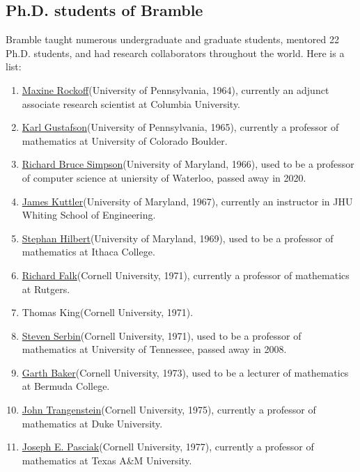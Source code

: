 \documentclass[CJK,11pt]{amsart}
\theoremstyle{definition}
\begin{document}
\begin{CJK*}{UTF8}{gbsn}
\subsection{Ph.D. students of Bramble}
Bramble taught numerous undergraduate and graduate students, mentored
22 Ph.D. students, and had  research collaborators
throughout the world. Here is a list:
% 
\begin{enumerate}
\item \href{https://www.linkedin.com/in/maxine-rockoff-394b114/}{Maxine Rockoff}(University of Pennsylvania, 1964), currently an adjunct associate research scientist at Columbia University.
\item \href{http://euclid.colorado.edu/~gustafs/}{Karl Gustafson}(University of Pennsylvania, 1965), currently a professor of mathematics at University of Colorado Boulder.
\item \href{https://cs.uwaterloo.ca/~rbsimpso/RBScv.pdf}{Richard Bruce Simpson}(University of Maryland, 1966), used to be a professor of computer science at uniersity of Waterloo, passed away in 2020.
\item \href{https://ep.jhu.edu/faculty/james-kuttler/}{James Kuttler}(University of Maryland, 1967), currently an instructor in JHU Whiting School of Engineering.
\item \href{https://en.wikipedia.org/wiki/Stephen_Hilbert}{Stephan Hilbert}(University of Maryland, 1969), used to be a professor of mathematics at Ithaca College.
\item \href{https://sites.math.rutgers.edu/~falk/}{Richard Falk}(Cornell University, 1971), currently a professor of mathematics at Rutgers.
\item Thomas King(Cornell University, 1971).
\item \href{https://www.legacy.com/us/obituaries/knoxnews/name/steven-serbin-obituary?pid=120620923}{Steven Serbin}(Cornell University, 1971), used to be a professor of mathematics at University of Tennessee, passed away in 2008.
\item \href{http://www.math.buffalo.edu/mad/PEEPS/baker_gartha.html}{Garth Baker}(Cornell University, 1973), used to be a lecturer of mathematics at Bermuda College.
\item \href{https://services.math.duke.edu/~johnt/}{John Trangenstein}(Cornell University, 1975), currently a professor of mathematics at Duke University.
\item \href{https://www.math.tamu.edu/~joe.pasciak/}{Joseph E. Pasciak}(Cornell University, 1977), currently a professor of mathematics at Texas A\&M University.

\end{enumerate}
\end{CJK*}
\end{document}
